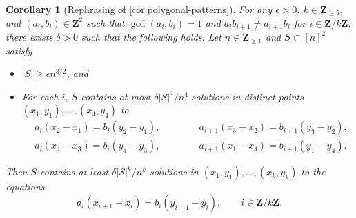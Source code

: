 \documentclass[reqno,11pt]{amsart}
\newtheorem{corollary}[theorem]{Corollary}
\theoremstyle{definition}
\theoremstyle{remark}
\numberwithin{equation}{section}
\newcommand{\Z}{\mathbf{Z}}
\begin{document}
\begin{corollary}[Rephrasing of \cref{cor:polygonal-patterns}] \label{cor:polygonal-patterns-rephrased}
For any $\epsilon > 0$, $k \in \Z_{\ge 5}$, and $(a_i, b_i) \in \Z^2$ such that $\gcd(a_i, b_i) = 1$ and $a_i b_{i+1} \neq a_{i+1} b_i$ for $i \in \Z/k\Z$, there exists $\delta > 0$ such that the following holds. Let $n \in \Z_{\ge 1}$ and $S \subset [n]^2$ satisfy
\begin{itemize}
    \item[$(i)$.] $|S| \ge \epsilon n^{3/2}$, and
    \item[$(ii)$.] For each $i$, $S$ contains at most $\delta |S|^4/n^4$ solutions in distinct points $(x_1, y_1), \ldots, (x_4, y_4)$ to
    \[
    \begin{aligned}
        &a_i(x_2 - x_1) = b_i(y_2 - y_1), \qquad\qquad 
        a_{i+1}(x_3 - x_2) = b_{i+1}(y_3 - y_2), \\
        &a_i(x_4 - x_3) = b_i(y_4 - y_3), \qquad\qquad 
        a_{i+1}(x_1 - x_4) = b_{i+1}(y_1 - y_4).
    \end{aligned}
    \]
\end{itemize}
Then $S$ contains at least $\delta |S|^k/n^k$ solutions in $(x_1, y_1), \ldots, (x_k, y_k)$ to the equations
\begin{equation} \label{eq:polygonal-solutions}
    a_i(x_{i+1} - x_i) = b_i(y_{i+1} - y_i), \qquad i \in \Z/k\Z.
\end{equation}
\end{corollary}
\end{document}
